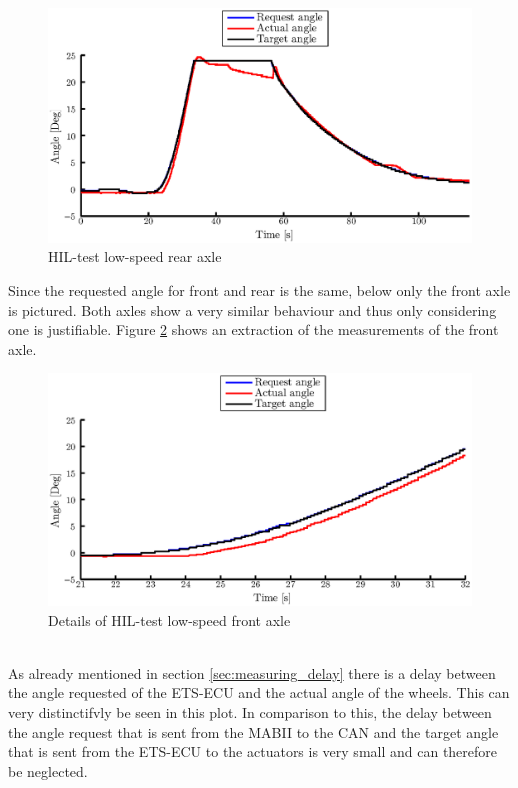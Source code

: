 \documentclass[ExampleMasters.tex]{subfiles}
\begin{document}
\begin{figure}[!htb]
	\centering
	\includegraphics[width=1\linewidth]{figures/HIL002_rear}
	\caption{\acrlong{HIL}-test low-speed rear axle}
	
	\label{fig:HIL002_rear}
\end{figure}
Since the requested angle for front and rear is the same, below only the front axle is pictured. Both axles show a very similar behaviour and thus only considering one is justifiable.
Figure \ref{fig:HIL002_front_closeup} shows an extraction of the measurements of the front axle. 
\begin{figure}[!htb]
	\centering
	\includegraphics[width=1\linewidth]{figures/HIL002_front_closeup}
	\caption{Details of \acrlong{HIL}-test low-speed front axle}
	
	\label{fig:HIL002_front_closeup}
\end{figure} \\
As already mentioned in section \ref{sec:measuring_delay} there is a delay between the angle requested of the \gls{ETS}-\gls{ECU} and the actual angle of the wheels. This can very distinctifvly be seen in this plot. In comparison to this, the delay between the angle request that is sent from the \gls{MABII} to the \gls{CAN} and the target angle that is sent from the \gls{ETS}-\gls{ECU} to the actuators is very small and can therefore be neglected.\\
\end{document}
